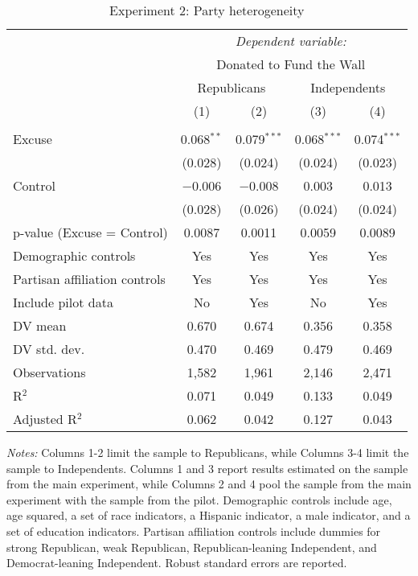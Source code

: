 
\begin{table}[!htbp] \centering 
  \caption{Experiment 2: Party heterogeneity} 
  \label{t:2-partyheterogeneity} 
\begin{threeparttable}
\begin{tabular}{@{\hspace{5pt}}l@{\hspace{5pt}}cccc} 
\toprule 
 & \multicolumn{4}{c}{\textit{Dependent variable:}} \\ 
\cmidrule(rr){2-5} 
 & \multicolumn{4}{c}{Donated to Fund the Wall} \\ 
 \cmidrule(rr){2-5}
 & \multicolumn{2}{c}{Republicans} & \multicolumn{2}{c}{Independents} \\ 
 & (1) & (2) & (3) & (4)\\ 
\midrule  
\\[-2.1ex] Excuse & 0.068$^{**}$ & 0.079$^{***}$ & 0.068$^{***}$ & 0.074$^{***}$ \\ 
  & (0.028) & (0.024) & (0.024) & (0.023) \\ 
 \addlinespace 
 Control & $-$0.006 & $-$0.008 & 0.003 & 0.013 \\ 
  & (0.028) & (0.026) & (0.024) & (0.024) \\ 
 \addlinespace 
p-value (Excuse = Control) & 0.0087 & 0.0011 & 0.0059 & 0.0089 \\ 
\midrule  
Demographic controls & Yes & Yes & Yes & Yes \\ 
Partisan affiliation controls & Yes & Yes & Yes & Yes \\ 
\midrule
Include pilot data & No & Yes & No & Yes \\
\addlinespace
DV mean & 0.670 & 0.674 & 0.356 & 0.358 \\
DV std. dev. & 0.470 & 0.469 & 0.479 & 0.469 \\
Observations & 1,582 & 1,961 & 2,146 & 2,471 \\ 
R$^{2}$ & 0.071 & 0.049 & 0.133 & 0.049 \\ 
Adjusted R$^{2}$ & 0.062 & 0.042 & 0.127 & 0.043 \\ 
\bottomrule 
\end{tabular} 
\begin{tablenotes}
\footnotesize
\item \textit{Notes:} Columns 1-2 limit the sample to Republicans, while Columns 3-4 limit the sample to Independents. Columns 1 and 3 report results estimated on the sample from the main experiment, while Columns 2 and 4 pool the sample from the main experiment with the sample from the pilot. Demographic controls include age, age squared, a set of race indicators, a Hispanic indicator, a male indicator, and a set of education indicators. Partisan affiliation controls include dummies for strong Republican, weak Republican, Republican-leaning Independent, and Democrat-leaning Independent. Robust standard errors are reported.
\end{tablenotes}
\end{threeparttable}
\end{table} 
